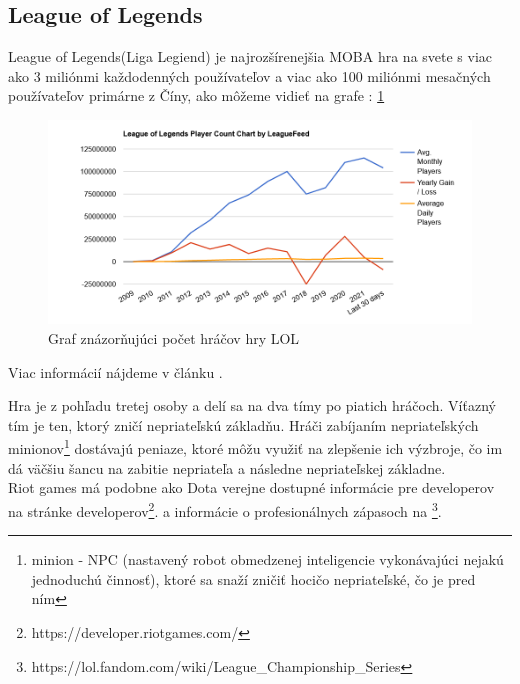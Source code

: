 \subsection{League of Legends}
League of Legends(Liga Legiend) je najrozšírenejšia MOBA hra na svete s viac ako 3 miliónmi každodenných používateľov a viac ako 100 miliónmi mesačných používateľov primárne z Číny, ako môžeme vidieť na grafe : \ref{leaguegraph} 

 \begin{figure}[h!]
	
	\includegraphics[width=.9\textwidth]{figures/leaguegraph}
	\centering
	\caption{ Graf znázorňujúci počet hráčov hry LOL  \label{leaguegraph}}
	
\end{figure}

Viac informácií nájdeme v článku \cite{leaguefeed}. 

Hra je z pohľadu tretej osoby a delí sa na dva tímy po piatich hráčoch. Víťazný tím je ten, ktorý zničí nepriateľskú základňu. Hráči zabíjaním nepriateľských minionov\footnote {
	minion - NPC (nastavený robot obmedzenej inteligencie vykonávajúci nejakú jednoduchú činnosť), ktoré sa snaží zničiť hocičo nepriateľské, čo je pred ním 
} dostávajú peniaze, ktoré môžu využiť na zlepšenie ich výzbroje, čo im dá väčšiu šancu na zabitie nepriateľa a následne nepriateľskej základne.
\\ 
Riot games má podobne ako Dota verejne dostupné informácie pre developerov na stránke developerov\footnote {
	https://developer.riotgames.com/
}.
a informácie o profesionálnych zápasoch na \footnote {https://lol.fandom.com/wiki/League\_Championship\_Series
}.

